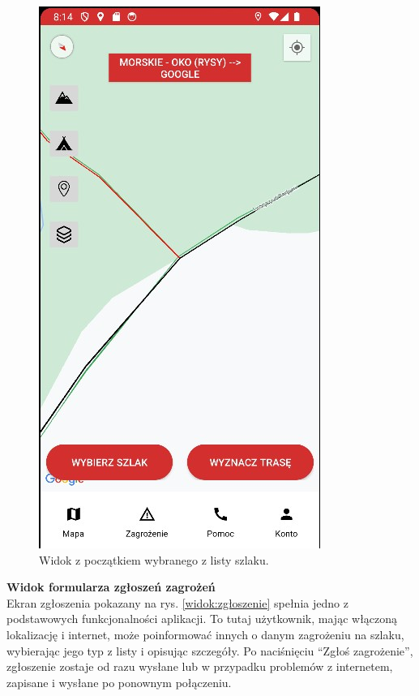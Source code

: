 \begin{figure}[H]
    \centering
    \includegraphics[scale=1.0]{img/imp/po-wyborze-z-listy.jpg}
    \caption{Widok z początkiem wybranego z listy szlaku.}
    \label{widok:szlak}
\end{figure}

\textbf{Widok formularza zgłoszeń zagrożeń} \\
Ekran zgłoszenia pokazany na rys. \ref{widok:zgłoszenie} spełnia jedno z podstawowych funkcjonalności aplikacji. To tutaj użytkownik, mając włączoną lokalizację i internet, może poinformować innych o danym zagrożeniu na szlaku, wybierając jego typ z listy i opisując szczegóły. Po naciśnięciu “Zgłoś zagrożenie”, zgłoszenie zostaje od razu wysłane lub w przypadku problemów z internetem, zapisane i wysłane po ponownym połączeniu.

